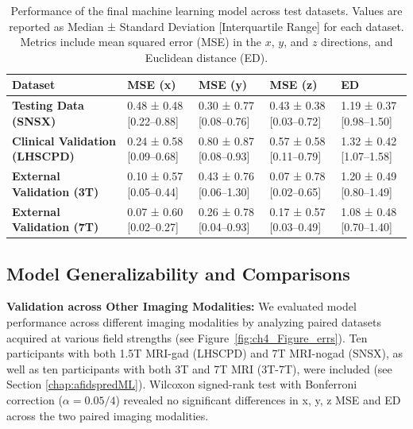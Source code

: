 \begin{table}[htbp]
\centering
\small
\caption{Performance of the final machine learning model across test datasets. Values are reported as Median ± Standard Deviation [Interquartile Range] for each dataset. Metrics include mean squared error (MSE) in the $x$, $y$, and $z$ directions, and Euclidean distance (ED).}
\label{tab:performance_metrics}
\begin{tabularx}{\textwidth}{lXXXX}
\toprule
\textbf{Dataset} & \textbf{MSE (x)} & \textbf{MSE (y)} & \textbf{MSE (z)} & \textbf{ED} \\
\midrule

\textbf{Testing Data (SNSX)} & 
0.48 ± 0.48 [0.22–0.88] & 
0.30 ± 0.77 [0.08–0.76] & 
0.43 ± 0.38 [0.03–0.72] & 
1.19 ± 0.37 [0.98–1.50] \\

\textbf{Clinical Validation (LHSCPD)} & 
0.24 ± 0.58 [0.09–0.68] & 
0.80 ± 0.87 [0.08–0.93] & 
0.57 ± 0.58 [0.11–0.79] & 
1.32 ± 0.42 [1.07–1.58] \\


\cmidrule(l){1-5}

\textbf{External Validation (3T)} & 
0.10 ± 0.57 [0.05–0.44] & 
0.43 ± 0.76 [0.06–1.30] & 
0.07 ± 0.78 [0.02–0.65] & 
1.20 ± 0.49 [0.80–1.49] \\

\textbf{External Validation (7T)} & 
0.07 ± 0.60 [0.02–0.27] & 
0.26 ± 0.78 [0.04–0.93] & 
0.17 ± 0.57 [0.03–0.49] & 
1.08 ± 0.48 [0.70–1.40] \\


\bottomrule
\end{tabularx}
\end{table}

\subsection{Model Generalizability and Comparisons}

\textbf{Validation across Other Imaging Modalities:} We evaluated model performance across different imaging modalities by analyzing paired datasets acquired at various field strengths (see Figure~\ref{fig:ch4_Figure_errs}). Ten participants with both 1.5T MRI-gad (LHSCPD) and 7T MRI-nogad (SNSX), as well as ten participants with both 3T and 7T MRI (3T-7T), were included (see Section \ref{chap:afidspredML}). Wilcoxon signed-rank test with Bonferroni correction ($\alpha = 0.05/4$) revealed no significant differences in x, y, z MSE and ED across the two paired imaging modalities.

